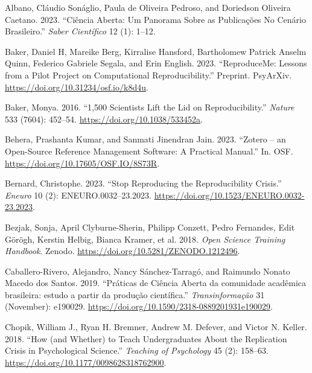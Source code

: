 \documentclass[
  a4paper,
]{article}
\newlength{\cslhangindent}
\newenvironment{CSLReferences}[2] %
 {\begin{list}{}{%
  \setlength{\itemindent}{0pt}
  \setlength{\leftmargin}{0pt}
  \setlength{\parsep}{0pt}
  \ifodd #1
   \setlength{\leftmargin}{\cslhangindent}
   \setlength{\itemindent}{-1\cslhangindent}
  \fi
  \setlength{\itemsep}{#2\baselineskip}}}
 {\end{list}}
\begin{document}
\label{refs}
\begin{CSLReferences}{1}{0}
Albano, Cláudio Sonáglio, Paula de Oliveira Pedroso, and Doriedson
Oliveira Caetano. 2023. {``Ci{ê}ncia {Aberta}: {Um Panorama} Sobre as
{Publica{ç}{õ}es} No {Cen{á}rio Brasileiro}.''} \emph{Saber
Cient{í}fico} 12 (1): 1--12.

Baker, Daniel H, Mareike Berg, Kirralise Hansford, Bartholomew Patrick
Anselm Quinn, Federico Gabriele Segala, and Erin English. 2023.
{``{ReproduceMe}: Lessons from a Pilot Project on Computational
Reproducibility.''} Preprint. PsyArXiv.
\url{https://doi.org/10.31234/osf.io/k8d4u}.

Baker, Monya. 2016. {``1,500 Scientists Lift the Lid on
Reproducibility.''} \emph{Nature} 533 (7604): 452--54.
\url{https://doi.org/10.1038/533452a}.

Behera, Prashanta Kumar, and Sanmati Jinendran Jain. 2023. {``Zotero --
an Open-Source Reference Management Software: A Practical Manual.''} In.
OSF. \url{https://doi.org/10.17605/OSF.IO/8S73R}.

Bernard, Christophe. 2023. {``Stop {Reproducing} the {Reproducibility
Crisis}.''} \emph{Eneuro} 10 (2): ENEURO.0032--23.2023.
\url{https://doi.org/10.1523/ENEURO.0032-23.2023}.

Bezjak, Sonja, April Clyburne-Sherin, Philipp Conzett, Pedro Fernandes,
Edit Görögh, Kerstin Helbig, Bianca Kramer, et al. 2018. \emph{Open
{Science Training Handbook}}. Zenodo.
\url{https://doi.org/10.5281/ZENODO.1212496}.

Caballero-Rivero, Alejandro, Nancy Sánchez-Tarragó, and Raimundo Nonato
Macedo dos Santos. 2019. {``{Pr{á}ticas de Ci{ê}ncia Aberta da
comunidade acad{ê}mica brasileira: estudo a partir da produ{ç}{ã}o
cient{í}fica}.''} \emph{Transinforma{ç}{ã}o} 31 (November): e190029.
\url{https://doi.org/10.1590/2318-0889201931e190029}.

Chopik, William J., Ryan H. Bremner, Andrew M. Defever, and Victor N.
Keller. 2018. {``How (and {Whether}) to {Teach Undergraduates About} the
{Replication Crisis} in {Psychological Science}.''} \emph{Teaching of
Psychology} 45 (2): 158--63.
\url{https://doi.org/10.1177/0098628318762900}.


\end{CSLReferences}
\end{document}
